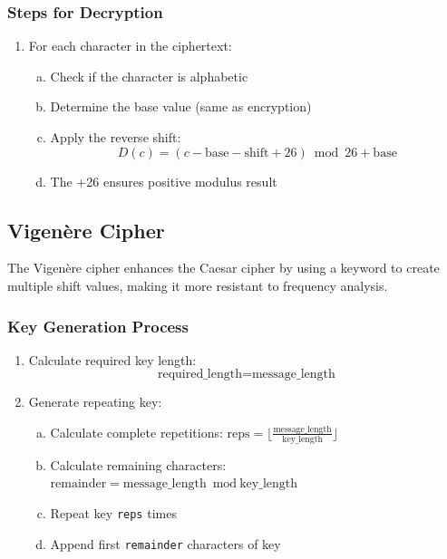 \documentclass[titlepage]{article}
\begin{document}
\subsubsection{ Steps for Decryption}
\begin{enumerate}[1.]
\item For each character in the ciphertext:
   \begin{enumerate}[a)]
   \item Check if the character is alphabetic
   \item Determine the base value (same as encryption)
   \item Apply the reverse shift:
      \begin{equation}
      D(c) = (c - \text{base} - \text{shift} + 26) \bmod 26 + \text{base}
      \end{equation}
   \item The +26 ensures positive modulus result
   \end{enumerate}
\end{enumerate}

\subsection{Vigenère Cipher}
The Vigenère cipher enhances the Caesar cipher by using a keyword to create multiple shift values, making it more resistant to frequency analysis.

\subsubsection{Key Generation Process}
\begin{enumerate}[1.]
\item Calculate required key length:
   \begin{equation}
   \text{required\_length} = \text{message\_length}
   \end{equation}
\item Generate repeating key:
   \begin{enumerate}[a)]
   \item Calculate complete repetitions: $\text{reps} = \lfloor\frac{\text{message\_length}}{\text{key\_length}}\rfloor$
   \item Calculate remaining characters: $\text{remainder} = \text{message\_length} \bmod \text{key\_length}$
   \item Repeat key \texttt{reps} times
   \item Append first \texttt{remainder} characters of key
   \end{enumerate}
\end{enumerate}
\end{document}
